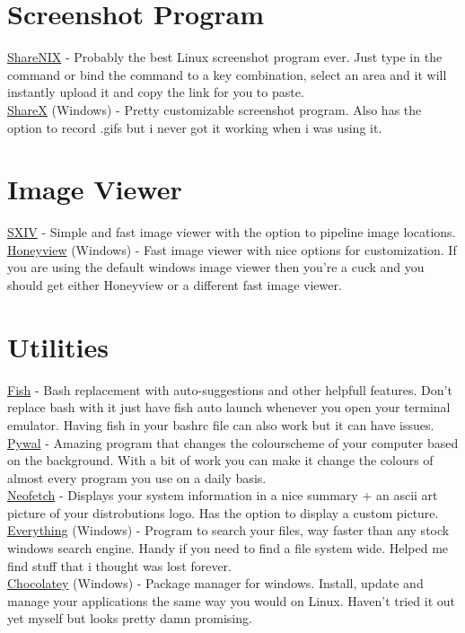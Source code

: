 \documentclass{article}
\begin{document}
\section{Screenshot Program}
	\href{https://github.com/Francesco149/sharenix}{ShareNIX} - Probably the best Linux screenshot program ever. Just type in the command or bind the command to a key combination, select an area and it will instantly upload it and copy the link for you to paste.\\
	\href{https://getsharex.com/}{ShareX} (Windows) - Pretty customizable screenshot program. Also has the option to record .gifs but i never got it working when i was using it.
\section{Image Viewer}
	\href{https://github.com/muennich/sxiv}{SXIV} - Simple and fast image viewer with the option to pipeline image locations.\\
	\href{http://www.bandisoft.com/honeyview/}{Honeyview} (Windows) - Fast image viewer with nice options for customization. If you are using the default windows image viewer then you're a cuck and you should get either Honeyview or a different fast image viewer.
\section{Utilities}
	\href{https://fishshell.com/}{Fish} - Bash replacement with auto-suggestions and other helpfull features. Don't replace bash with it just have fish auto launch whenever you open your terminal emulator. Having fish in your bashrc file can also work but it can have issues.\\
	\href{https://github.com/dylanaraps/pywal}{Pywal} - Amazing program that changes the colourscheme of your computer based on the background. With a bit of work you can make it change the colours of almost every program you use on a daily basis.\\
	\href{https://github.com/dylanaraps/neofetch}{Neofetch} - Displays your system information in a nice summary + an ascii art picture of your distrobutions logo. Has the option to display a custom picture.\\
	\href{https://www.voidtools.com/}{Everything} (Windows) - Program to search your files, way faster than any stock windows search engine. Handy if you need to find a file system wide. Helped me find stuff that i thought was lost forever.\\
	\href{https://chocolatey.org/}{Chocolatey} (Windows) - Package manager for windows. Install, update and manage your applications the same way you would on Linux. Haven't tried it out yet myself but looks pretty damn promising.
\end{document}
